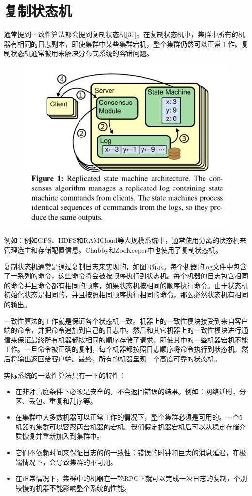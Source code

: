\documentclass[journal]{IEEEtran}
\begin{document}
\section{复制状态机}
通常提到一致性算法都会提到复制状态机[37]。在复制状态机中，集群中所有的机器有相同的日志副本，即使集群中某些集群宕机，整个集群仍然可以正常工作。复制状态机通常被用来解决分布式系统的容错问题。
\begin{figure}[htbp]
\begin{center}
\includegraphics[width=1\linewidth]{./fig1.png}
\end{center}
\end{figure}
例如：例如GFS、HDFS和RAMCloud等大规模系统中，通常使用分离的状态机来管理选主和存储配置信息。Chubby和ZooKeeper中也使用了复制状态机。


复制状态机通常是通过复制日志来实现的，如图1所示。每个机器的log文件中包含了一系列的命令，这些命令将会被按顺序执行到状态机。每个机器的日志包含相同的命令并且命令都有相同的顺序，如果状态机按相同的顺序执行命令。由于状态机初始化状态是相同的，并且按照相同顺序执行相同的命令，那么必然状态机有相同的输出。


一致性算法的工作就是保证各个状态机一致。机器上的一致性模块接受到来自客户端的命令，并把命令追加到自己的日志中。然后和其它机器上的一致性模块进行通信来保证最终所有机器都按相同的顺序存储了请求，即使其中的一些机器宕机不能工作。一旦命令被正确的复制，每个机器都按照日志顺序将命令执行到状态机，然后将输出返回给客户端。最终，所有的机器呈现一个高度可靠的状态机。

实际系统的一致性算法具有一下的特性：
\begin{itemize}
\item 在非拜占庭条件下必须是安全的，不会返回错误的结果。例如：网络延时、分区、丢包、重复和乱序等。
\item 在集群中大多数机器可以正常工作的情况下，整个集群必须是可用的。一个5机器的集群可以容忍两台机器的宕机。我们假定机器宕机后可以从稳定存储介质恢复并重新加入到集群中。
\item 它们不依赖时间来保证日志的的一致性：错误的时钟和巨大的消息延迟，在极端情况下，会导致集群的不可用。
\item 在正常情况下，集群中的机器在一轮RPC下就可以完成一次日志的复制，个别较慢的机器不能影响整个系统的性能。
\end{itemize}
\end{document}
